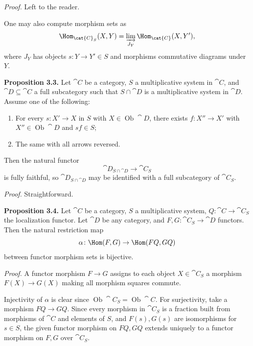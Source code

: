 \textit{Proof.} Left to the reader.

One may also compute morphism sets as
\[
\Hom_{\cat{C}_S}(X,Y) = \varinjlim_{J_Y}\Hom_{\cat{C}}(X,Y'),
\]
where \(J_Y\) has objects \(s\colon Y\to Y'\in S\) and morphisms commutative diagrams under \(Y\).

\medskip
\textbf{Proposition 3.3.}
Let \(\cat{C}\) be a category, \(S\) a multiplicative system in \(\cat{C}\), and \(\cat{D}\subseteq\cat{C}\) a full subcategory such that \(S\cap\cat{D}\) is a multiplicative system in \(\cat{D}\). Assume one of the following:
\begin{enumerate}
\item[(i)] For every \(s\colon X'\to X\) in \(S\) with \(X\in\operatorname{Ob}\cat{D}\), there exists \(f\colon X''\to X'\) with \(X''\in\operatorname{Ob}\cat{D}\) and \(sf\in S\);
\item[(ii)] The same with all arrows reversed.
\end{enumerate}
Then the natural functor
\[
\cat{D}_{S\cap\cat{D}} \to \cat{C}_S
\]
is fully faithful, so \(\cat{D}_{S\cap\cat{D}}\) may be identified with a full subcategory of \(\cat{C}_S\).

\setcounter{page}{33}
\textit{Proof.} Straightforward.

\medskip
\textbf{Proposition 3.4.}
Let \(\cat{C}\) be a category, \(S\) a multiplicative system, \(Q\colon\cat{C}\to\cat{C}_S\) the localization functor. Let \(\cat{D}\) be any category, and \(F,G\colon\cat{C}_S\to\cat{D}\) functors. Then the natural restriction map
\[
\alpha\colon \Hom(F,G) \to \Hom(FQ,GQ)
\]
between functor morphism sets is bijective.

\setcounter{page}{34}
\textit{Proof.}
A functor morphism \(F\to G\) assigns to each object \(X\in\cat{C}_S\) a morphism \(F(X)\to G(X)\) making all morphism squares commute.

Injectivity of \(\alpha\) is clear since \(\operatorname{Ob}\cat{C}_S=\operatorname{Ob}\cat{C}\). For surjectivity, take a morphism \(FQ\to GQ\). Since every morphism in \(\cat{C}_S\) is a fraction built from morphisms of \(\cat{C}\) and elements of \(S\), and \(F(s),G(s)\) are isomorphisms for \(s\in S\), the given functor morphism on \(FQ,GQ\) extends uniquely to a functor morphism on \(F,G\) over \(\cat{C}_S\).